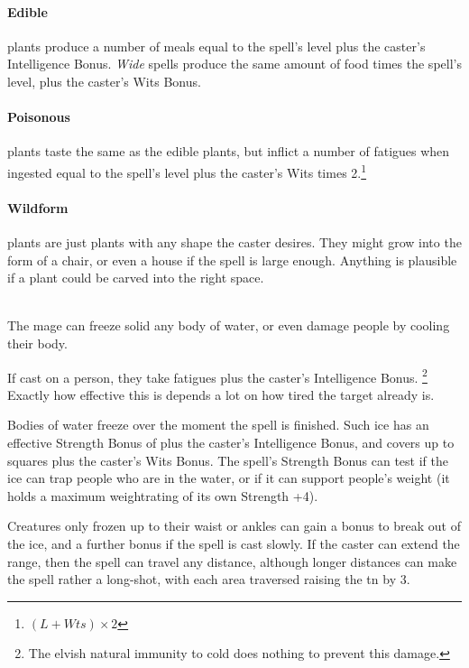 \begin{multicols}{2}
\paragraph{Edible} plants produce a number of meals equal to the spell's level plus the caster's Intelligence Bonus.
\textit{Wide} spells produce the same amount of food times the spell's level, plus the caster's Wits Bonus.

\paragraph{Poisonous} plants taste the same as the edible plants, but inflict a number of \glspl{fatigue} when ingested equal to the spell's level plus the caster's Wits times 2.\footnote{$(L + Wts)\times 2$}

\paragraph{Wildform} plants are just plants with any shape the caster desires.
They might grow into the form of a chair, or even a house if the spell is large enough.
Anything is plausible if a plant could be carved into the right space.

\\
The mage can freeze solid any body of water, or even damage people by cooling their body.

If cast on a person, they take  \glspl{fatigue} plus the caster's Intelligence Bonus.%
\footnote{The elvish natural immunity to cold does nothing to prevent this damage.}
Exactly how effective this is depends a lot on how tired the target already is.

Bodies of water freeze over the moment the spell is finished.
Such ice has an effective Strength Bonus of  plus the caster's Intelligence Bonus, and covers up to  squares plus the caster's Wits Bonus.
The spell's Strength Bonus can test if the ice can trap people who are in the water, or if it can support people's weight (it holds a maximum \gls{weightrating} of its own Strength +4).

Creatures only frozen up to their waist or ankles can gain a bonus to break out of the ice, and a further bonus if the spell is cast slowly.
If the caster can extend the range, then the spell can travel any distance, although longer distances can make the spell rather a long-shot, with each area traversed raising the \gls{tn} by 3.


\end{multicols}
